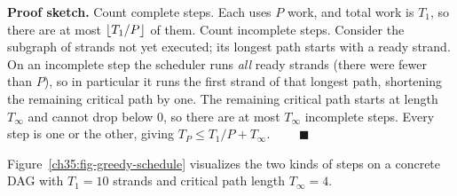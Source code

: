 \begin{formalbox}
\textbf{Proof sketch.} Count complete steps. Each uses $P$ work, and total work is
$T_1$, so there are at most $\lfloor T_1/P\rfloor$ of them. Count incomplete steps.
Consider the subgraph of strands not yet executed; its longest path starts with a
ready strand. On an incomplete step the scheduler runs \emph{all} ready strands
(there were fewer than $P$), so in particular it runs the first strand of that
longest path, shortening the remaining critical path by one. The remaining
critical path starts at length $T_\infty$ and cannot drop below $0$, so there are
at most $T_\infty$ incomplete steps. Every step is one or the other, giving
$T_P \le T_1/P + T_\infty$. $\qquad\blacksquare$
\end{formalbox}

Figure~\ref{ch35:fig-greedy-schedule} visualizes the two kinds of steps on a
concrete DAG with $T_1 = 10$ strands and critical path length $T_\infty = 4$.

